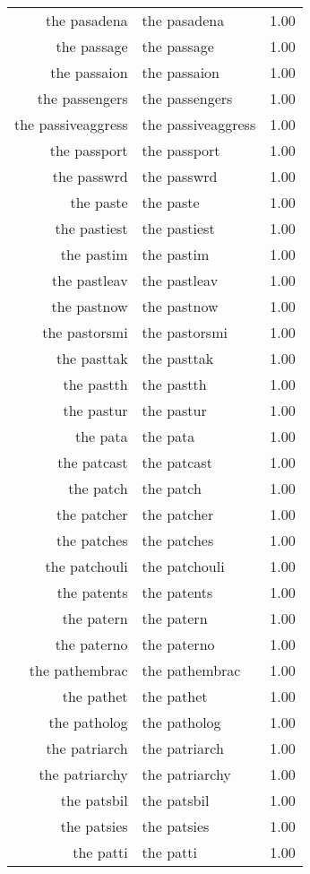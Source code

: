 \begin{table}[ht]
\begin{tabular}{rlr}
  the pasadena & the pasadena & 1.00 \\ 
  the passage & the passage & 1.00 \\ 
  the passaion & the passaion & 1.00 \\ 
  the passengers & the passengers & 1.00 \\ 
  the passiveaggress & the passiveaggress & 1.00 \\ 
  the passport & the passport & 1.00 \\ 
  the passwrd & the passwrd & 1.00 \\ 
  the paste & the paste & 1.00 \\ 
  the pastiest & the pastiest & 1.00 \\ 
  the pastim & the pastim & 1.00 \\ 
  the pastleav & the pastleav & 1.00 \\ 
  the pastnow & the pastnow & 1.00 \\ 
  the pastorsmi & the pastorsmi & 1.00 \\ 
  the pasttak & the pasttak & 1.00 \\ 
  the pastth & the pastth & 1.00 \\ 
  the pastur & the pastur & 1.00 \\ 
  the pata & the pata & 1.00 \\ 
  the patcast & the patcast & 1.00 \\ 
  the patch & the patch & 1.00 \\ 
  the patcher & the patcher & 1.00 \\ 
  the patches & the patches & 1.00 \\ 
  the patchouli & the patchouli & 1.00 \\ 
  the patents & the patents & 1.00 \\ 
  the patern & the patern & 1.00 \\ 
  the paterno & the paterno & 1.00 \\ 
  the pathembrac & the pathembrac & 1.00 \\ 
  the pathet & the pathet & 1.00 \\ 
  the patholog & the patholog & 1.00 \\ 
  the patriarch & the patriarch & 1.00 \\ 
  the patriarchy & the patriarchy & 1.00 \\ 
  the patsbil & the patsbil & 1.00 \\ 
  the patsies & the patsies & 1.00 \\ 
  the patti & the patti & 1.00 \\ 

\end{tabular}
\end{table}
